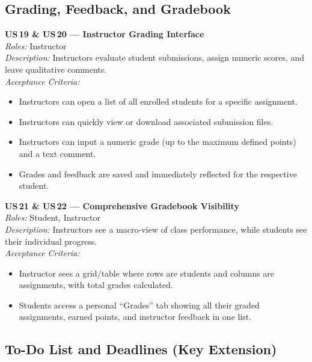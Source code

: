\documentclass[11pt, legalpaper]{article}
\begin{document}
\subsection{Grading, Feedback, and Gradebook}

\begin{userstory}
  \textbf{US\,19 \& US\,20 — Instructor Grading Interface}\\[4pt]
  \textit{Roles:} Instructor\\[2pt]
  \textit{Description:} Instructors evaluate student submissions, assign
  numeric scores, and leave qualitative comments.\\[4pt]
  \textit{Acceptance Criteria:}
  \begin{itemize}
    \item Instructors can open a list of all enrolled students for a specific
          assignment.
    \item Instructors can quickly view or download associated submission files.
    \item Instructors can input a numeric grade (up to the maximum defined
          points) and a text comment.
    \item Grades and feedback are saved and immediately reflected for the
          respective student.
  \end{itemize}
\end{userstory}

\begin{userstory}
  \textbf{US\,21 \& US\,22 — Comprehensive Gradebook Visibility}\\[4pt]
  \textit{Roles:} Student, Instructor\\[2pt]
  \textit{Description:} Instructors see a macro-view of class performance,
  while students see their individual progress.\\[4pt]
  \textit{Acceptance Criteria:}
  \begin{itemize}
    \item Instructor sees a grid/table where rows are students and columns are
          assignments, with total grades calculated.
    \item Students access a personal ``Grades'' tab showing all their graded
          assignments, earned points, and instructor feedback in one list.
  \end{itemize}
\end{userstory}

\subsection{To-Do List and Deadlines \texorpdfstring{\normalfont\small(Key Extension)}{}}
\end{document}
